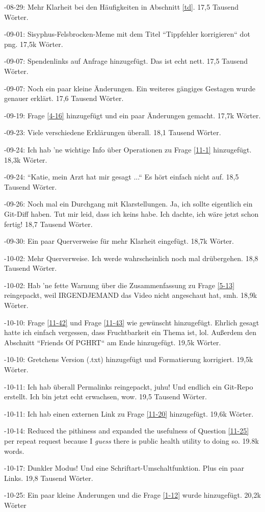 \documentclass{article}
\begin{document}
-08-29: Mehr Klarheit bei den Häufigkeiten in Abschnitt \ref{td}. 17,5 Tausend Wörter.

-09-01: Sisyphus-Felsbrocken-Meme mit dem Titel “Tippfehler korrigieren“ dot png. 17,5k Wörter.

-09-07: Spendenlinks auf Anfrage hinzugefügt. Das ist echt nett. 17,5 Tausend Wörter.

-09-07: Noch ein paar kleine Änderungen. Ein weiteres gängiges Gestagen wurde genauer erklärt. 17,6 Tausend Wörter.

-09-19: Frage \ref{4-16} hinzugefügt und ein paar Änderungen gemacht. 17,7k Wörter.

-09-23: Viele verschiedene Erklärungen überall. 18,1 Tausend Wörter.

-09-24: Ich hab 'ne wichtige Info über Operationen zu Frage \ref{11-1} hinzugefügt. 18,3k Wörter.

-09-24: “Katie, mein Arzt hat mir gesagt ...“ Es hört einfach nicht auf. 18,5 Tausend Wörter.

-09-26: Noch mal ein Durchgang mit Klarstellungen. Ja, ich sollte eigentlich ein Git-Diff haben. Tut mir leid, dass ich keins habe. Ich dachte, ich wäre jetzt schon fertig! 18,7 Tausend Wörter.

-09-30: Ein paar Querverweise für mehr Klarheit eingefügt. 18,7k Wörter.

-10-02: Mehr Querverweise. Ich werde wahrscheinlich noch mal drübergehen. 18,8 Tausend Wörter.

-10-02: Hab 'ne fette Warnung über die Zusammenfassung zu Frage \ref{5-13} reingepackt, weil IRGENDJEMAND das Video nicht angeschaut hat, smh. 18,9k Wörter.

-10-10: Frage \ref{11-42} und Frage \ref{11-43} wie gewünscht hinzugefügt. Ehrlich gesagt hatte ich einfach vergessen, dass Fruchtbarkeit ein Thema ist, lol. Außerdem den Abschnitt “Friends Of PGHRT“ am Ende hinzugefügt. 19,5k Wörter.

-10-10: Gretchens Version (.txt) hinzugefügt und Formatierung korrigiert. 19,5k Wörter.

-10-11: Ich hab überall Permalinks reingepackt, juhu! Und endlich ein Git-Repo erstellt. Ich bin jetzt echt erwachsen, wow. 19,5 Tausend Wörter.

-10-11: Ich hab einen externen Link zu Frage \ref{11-20} hinzugefügt. 19,6k Wörter.

-10-14: Reduced the pithiness and expanded the usefulness of Question \ref{11-25} per repeat request because I \textit{guess} there is public health utility to doing so. 19.8k words.

-10-17: Dunkler Modus! Und eine Schriftart-Umschaltfunktion. Plus ein paar Links. 19,8 Tausend Wörter.

-10-25: Ein paar kleine Änderungen und die Frage \ref{1-12} wurde hinzugefügt. 20,2k Wörter
\end{document}
